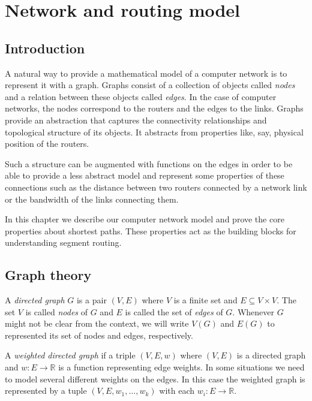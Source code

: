 \chapter{Network and routing model}
\label{chapter:graphs}

\section*{Introduction}

A natural way to provide a mathematical model of a computer network is to represent it with a graph. 
Graphs consist of a collection
of objects called \emph{nodes} and a relation between these objects called \emph{edges}. In the case of computer networks, 
the nodes correspond to the routers and the edges to the links. Graphs provide an abstraction that captures
the connectivity relationships and topological structure of its objects. It abstracts from properties
like, say, physical position of the routers. 

Such a structure can be augmented with functions on the edges in order to be able to provide a less abstract	
model and represent some properties of these connections such as the distance between two routers connected
by a network link or the bandwidth of the links connecting them.

In this chapter we describe our computer network model and prove the core properties about shortest paths.
These properties act as the building blocks for understanding segment routing.

\section{Graph theory}

\begin{definition}
A \emph{directed graph} $G$ is a pair $(V, E)$ where $V$ is a finite set and $E \subseteq V \times V$. 
The set $V$ is called \emph{nodes} of $G$ and $E$ is called the set of \emph{edges} of $G$. Whenever $G$ might
not be clear from the context, we will write $V(G)$ and $E(G)$ to represented its set of nodes and edges, respectively.
\end{definition}

\begin{definition}
A \emph{weighted directed graph} if a triple $(V, E, w)$ where $(V, E)$ is a directed graph and
$w : E \rightarrow \mathbb{R}$ is a function representing edge weights. In some situations we need
to model several different weights on the edges. In this case the weighted graph is represented by
a tuple $(V, E, w_1, \ldots, w_k)$ with each $w_i : E \rightarrow \mathbb{R}$.
\end{definition}

